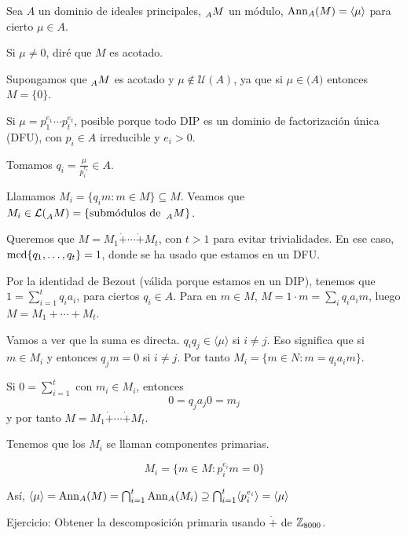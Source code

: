 \begin{df}
  Sea \(A\) un dominio de ideales principales, \(\prescript{}{A}{M}\)
  un módulo, \(\operatorname{Ann}_A(M)=\langle\mu\rangle\) para cierto \(\mu\in A\).

  Si \(\mu\neq 0\), diré que \(M\) es acotado.
\end{df}

Supongamos que \(\prescript{}{A}{M}\) es acotado y \(\mu\not\in
\mathcal{U}(A)\), ya que si \(\mu\in\mathcal(A)\) entonces \(M=\{0\}\).

Si \(\mu=p_1^{e_1}\cdots p_t^{e_t}\), posible porque todo DIP es un
dominio de factorización única (DFU), con \(p_i\in A\) irreducible
y \(e_i>0\).

\begin{prop}
  Tomamos \(q_i=\frac{\mu}{p_i^{e_i}}\in A\).

  Llamamos \(M_i=\{q_i m:m \in M\}\subseteq M\). Veamos
  que \(M_i\in\mathcal{L}(\prescript{}{A}{M})=\{\textrm{submódulos
  de } \prescript{}{A}{M}\}\).

  Queremos que \(M=M_1\dot{+}\cdots \dot{+}M_t\), con \(t>1\) para
  evitar trivialidades. En ese caso, \(\operatorname{mcd}\{q_1,\ldots,q_t\}=1\),
  donde se ha usado que estamos en un DFU.\@

  Por la identidad de Bezout (válida porque estamos en un DIP),
  tenemos que \(1=\sum_{i=1}^t q_i a_i\), para ciertos \(q_i\in A\).
  Para en \(m\in M\), \(M=1\cdot m=\sum_i q_i a_i m\), luego
  \(M=M_1+\cdots+ M_t\).

  Vamos a ver que la suma es directa.
  \(q_i q_j\in\langle\mu\rangle\) si \(i\neq j\). Eso significa que si
  \(m\in M_i\) y entonces \(q_j m= 0\) si \(i\neq j\).
  Por tanto \(M_i=\{m\in N: m=q_i a_i m\}\).

  Si \(0=\sum_{i=1}^t\) con \(m_i\in M_i\), entonces
  \[
    0=q_j a_j 0=m_j
  \]
  y por tanto \(M=M_1\dot{+}\cdots\dot{+} M_t\).
\end{prop}

\begin{df}
  Tenemos que los \(M_i\) se llaman componentes primarias.
\end{df}
\begin{prop}
  \[
    M_i=\{m\in M: p_i^{e_i} m=0\}
  \]

  Así, \(\langle\mu\rangle=\operatorname{Ann}_A(M)=\bigcap_{i=1}^t\operatorname{Ann}_A(M_i)
  \supseteq\bigcap_{i=1}^t\langle p_i^{e_i}\rangle=\langle\mu\rangle\)
\end{prop}

Ejercicio: Obtener la descomposición primaria usando \(\dot{+}\) de
\(\mathbb{Z}_{8000}\).
